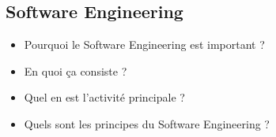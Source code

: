\subsection{Software Engineering}


\begin{itemize}
	\item Pourquoi le Software Engineering est important ?
	\item En quoi ça consiste ?
	\item Quel en est l'activité principale ?
	\item Quels sont les principes du Software Engineering ?
\end{itemize}